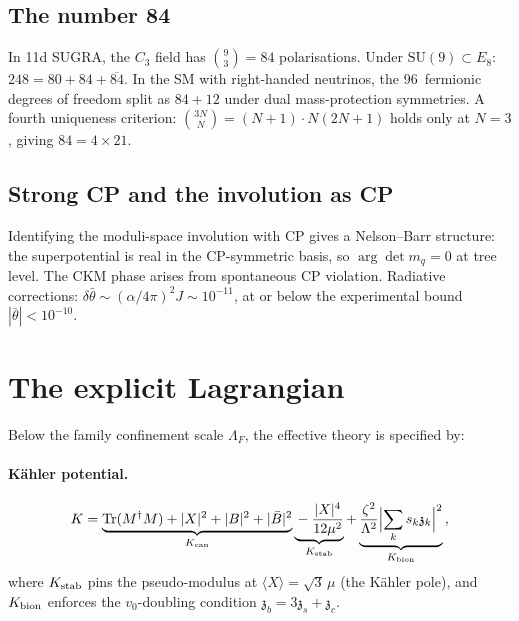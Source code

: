 \documentclass[12pt,a4paper]{article}
\newcommand{\SU}{\mathrm{SU}}
\newcommand{\Tr}{\mathrm{Tr}}
\newcommand{\zch}{\mathfrak{z}}
\begin{document}
\subsection{The number 84}

In 11d SUGRA, the $C_3$ field has
$\binom{9}{3} = 84$ polarisations.
Under $\SU(9) \subset E_8$:
$248 = 80 + 84 + \overline{84}$.
In the SM with right-handed neutrinos, the 96~fermionic
degrees of freedom split as $84 + 12$ under dual
mass-protection symmetries.
A fourth uniqueness criterion:
$\binom{3N}{N} = (N{+}1) \cdot N(2N{+}1)$ holds only at $N = 3$,
giving $84 = 4 \times 21$.

\subsection{Strong CP and the involution as CP}

Identifying the moduli-space involution with CP gives a
Nelson--Barr structure: the superpotential is real in the
CP-symmetric basis, so $\arg\det m_q = 0$ at tree level.
The CKM phase arises from spontaneous CP violation.
Radiative corrections:
$\delta\bar\theta \sim (\alpha/4\pi)^2 J \sim 10^{-11}$,
at or below the experimental bound $|\bar\theta| < 10^{-10}$.


\section{The explicit Lagrangian}
\label{sec:lagrangian}

Below the family confinement scale $\Lambda_F$, the effective
theory is specified by:

\paragraph{K\"ahler potential.}
\begin{equation}
  K = \underbrace{\Tr(M^\dagger M) + |X|^2 + |B|^2
    + |\bar{B}|^2}_{K_{\rm can}}
  \underbrace{{} - \frac{|X|^4}{12\mu^2}}_{K_{\rm stab}}
  + \underbrace{\frac{\zeta^2}{\Lambda^2}
    \Bigl|\sum_{k} s_k \zch_k\Bigr|^2}_{K_{\rm bion}}\,,
  \label{eq:Kahler}
\end{equation}
where $K_{\rm stab}$ pins the pseudo-modulus at
$\langle X \rangle = \sqrt{3}\,\mu$ (the K\"ahler pole),
and $K_{\rm bion}$ enforces the $v_0$-doubling condition
$\zch_b = 3\zch_s + \zch_c$.
\end{document}
